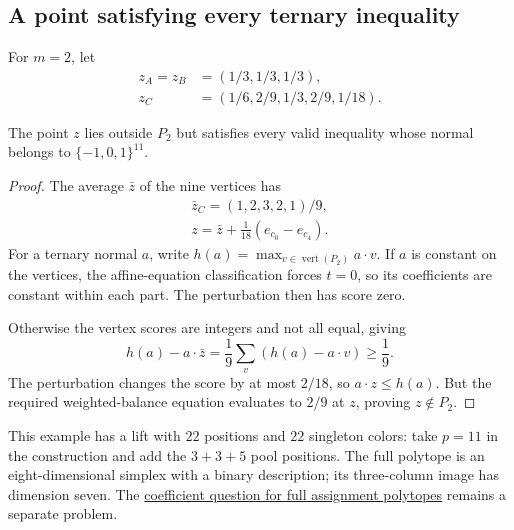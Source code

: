\subsection[ternaryWitness]{A point satisfying every ternary inequality}

For $m=2$, let
\[
 \begin{aligned}
 z_A=z_B&=(1/3,1/3,1/3),\\
 z_C&=(1/6,2/9,1/3,2/9,1/18).
 \end{aligned}
\]

\begin{proposition}
The point $z$ lies outside $P_2$ but satisfies every valid inequality
whose normal belongs to $\{-1,0,1\}^{11}$.
\end{proposition}

\begin{proof}
The average $\bar z$ of the nine vertices has
\[
 \begin{gathered}
 \bar z_C=(1,2,3,2,1)/9,\\
 z=\bar z+\frac1{18}(e_{c_0}-e_{c_4}).
 \end{gathered}
\]
For a ternary normal $a$, write
$h(a)=\max_{v\in\operatorname{vert}(P_2)}a\cdot v$.
If $a$ is constant on the vertices, the affine-equation classification
forces $t=0$, so its coefficients are constant within each part.
The perturbation then has score zero.

Otherwise the vertex scores are integers and not all equal, giving
\[
 h(a)-a\cdot\bar z
 =\frac19\sum_v(h(a)-a\cdot v)\geq\frac19.
\]
The perturbation changes the score by at most $2/18$, so
$a\cdot z\leq h(a)$. But the required weighted-balance equation
evaluates to $2/9$ at $z$, proving $z\notin P_2$.
\end{proof}

This example has a lift with $22$ positions and $22$ singleton colors:
take $p=11$ in the construction and add the $3+3+5$ pool positions.
The full polytope is an eight-dimensional simplex with a binary
description; its three-column image has dimension seven.
The \href{polytope.htm#generalPolytopeDescription}{coefficient question
for full assignment polytopes} remains a separate problem.
